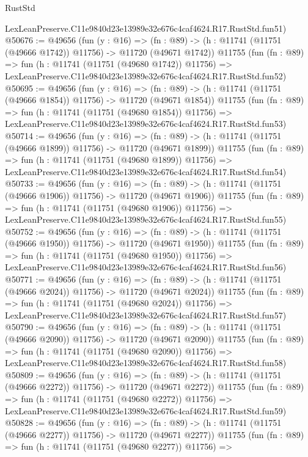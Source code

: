 \begin{lexlean}{RustStd}
\begin{coremodule}
    LexLeanPreserve.C11e9840d23e13989e32e676c4caf4624.R17.RustStd.fun51)
@50676 := @49656
    (fun (y : @16) =>
    (fn : @89) -> (h : @11741 (@11751 (@49666 @1742)) @11756) -> @11720 (@49671 @1742))
    @11755
    (fun (fn : @89) =>
    fun (h : @11741 (@11751 (@49680 @1742)) @11756) =>
    LexLeanPreserve.C11e9840d23e13989e32e676c4caf4624.R17.RustStd.fun52)
@50695 := @49656
    (fun (y : @16) =>
    (fn : @89) -> (h : @11741 (@11751 (@49666 @1854)) @11756) -> @11720 (@49671 @1854))
    @11755
    (fun (fn : @89) =>
    fun (h : @11741 (@11751 (@49680 @1854)) @11756) =>
    LexLeanPreserve.C11e9840d23e13989e32e676c4caf4624.R17.RustStd.fun53)
@50714 := @49656
    (fun (y : @16) =>
    (fn : @89) -> (h : @11741 (@11751 (@49666 @1899)) @11756) -> @11720 (@49671 @1899))
    @11755
    (fun (fn : @89) =>
    fun (h : @11741 (@11751 (@49680 @1899)) @11756) =>
    LexLeanPreserve.C11e9840d23e13989e32e676c4caf4624.R17.RustStd.fun54)
@50733 := @49656
    (fun (y : @16) =>
    (fn : @89) -> (h : @11741 (@11751 (@49666 @1906)) @11756) -> @11720 (@49671 @1906))
    @11755
    (fun (fn : @89) =>
    fun (h : @11741 (@11751 (@49680 @1906)) @11756) =>
    LexLeanPreserve.C11e9840d23e13989e32e676c4caf4624.R17.RustStd.fun55)
@50752 := @49656
    (fun (y : @16) =>
    (fn : @89) -> (h : @11741 (@11751 (@49666 @1950)) @11756) -> @11720 (@49671 @1950))
    @11755
    (fun (fn : @89) =>
    fun (h : @11741 (@11751 (@49680 @1950)) @11756) =>
    LexLeanPreserve.C11e9840d23e13989e32e676c4caf4624.R17.RustStd.fun56)
@50771 := @49656
    (fun (y : @16) =>
    (fn : @89) -> (h : @11741 (@11751 (@49666 @2024)) @11756) -> @11720 (@49671 @2024))
    @11755
    (fun (fn : @89) =>
    fun (h : @11741 (@11751 (@49680 @2024)) @11756) =>
    LexLeanPreserve.C11e9840d23e13989e32e676c4caf4624.R17.RustStd.fun57)
@50790 := @49656
    (fun (y : @16) =>
    (fn : @89) -> (h : @11741 (@11751 (@49666 @2090)) @11756) -> @11720 (@49671 @2090))
    @11755
    (fun (fn : @89) =>
    fun (h : @11741 (@11751 (@49680 @2090)) @11756) =>
    LexLeanPreserve.C11e9840d23e13989e32e676c4caf4624.R17.RustStd.fun58)
@50809 := @49656
    (fun (y : @16) =>
    (fn : @89) -> (h : @11741 (@11751 (@49666 @2272)) @11756) -> @11720 (@49671 @2272))
    @11755
    (fun (fn : @89) =>
    fun (h : @11741 (@11751 (@49680 @2272)) @11756) =>
    LexLeanPreserve.C11e9840d23e13989e32e676c4caf4624.R17.RustStd.fun59)
@50828 := @49656
    (fun (y : @16) =>
    (fn : @89) -> (h : @11741 (@11751 (@49666 @2277)) @11756) -> @11720 (@49671 @2277))
    @11755
    (fun (fn : @89) =>
    fun (h : @11741 (@11751 (@49680 @2277)) @11756) =>

\end{coremodule}
\end{lexlean}
